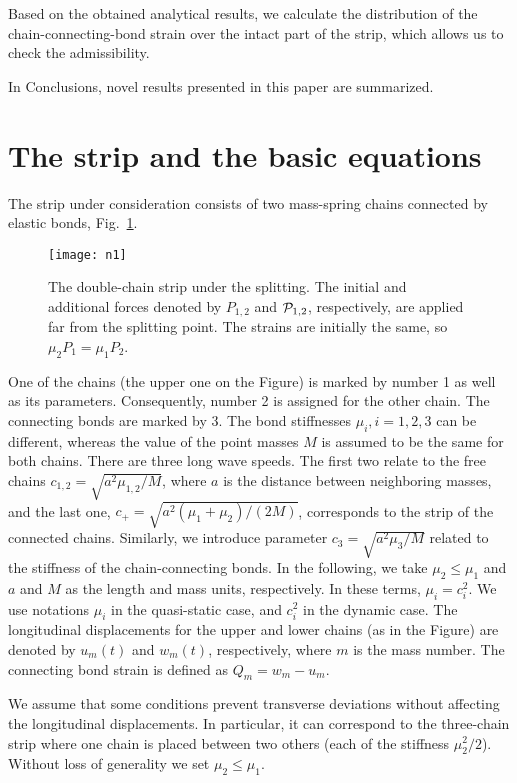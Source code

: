 \documentclass[12pt]{article}
\newcommand\fig[1]{Fig.~\ref{#1}}
\newcommand{\res}{respectively}
\newcommand{\CP}{{\cal P}}
\newcommand{\Gm}{\mu}
\begin{document}
Based on the obtained analytical results, we calculate the distribution of the chain-connecting-bond strain over the intact part of the strip, which allows us to check the admissibility.

In Conclusions, novel results presented in this paper are summarized.



\section{The strip and the basic equations}
The strip under consideration consists of two mass-spring chains connected by elastic bonds, \fig{f1}.
\begin{figure}[h]
\centering
\texttt{[image: n1]}

\vspace{-3mm}
\caption{The double-chain strip under the splitting. The initial and additional forces denoted by $P_{1,2}$ and $\CP_{1,2}$, \res, are applied far from the splitting point. The strains are initially the same, so $\Gm_2P_1=\Gm_1P_2$.}
\label{f1}
\end{figure}
One of the chains (the upper one on the Figure) is marked by number 1 as well as its parameters. Consequently, number 2 is assigned for the other chain. The connecting bonds are marked by 3. The bond stiffnesses $\Gm_i, i=1,2,3$ can be different, whereas the value of the point masses $M$ is assumed to be the same for both chains. There are three long wave speeds. The first two relate to the free chains $c_{1,2} = \sqrt{a^2\Gm_{1,2}/M}$, where $a$ is the distance between neighboring masses, and the last one, $c_+= \sqrt{a^2(\Gm_1+\Gm_2)/(2M)}$, corresponds to the strip of the connected chains. Similarly, we introduce parameter $c_3 = \sqrt{a^2\Gm_3/M}$  related to the stiffness of the chain-connecting bonds. In the following, we take $\Gm_2\le \Gm_1$ and $a$ and $M$ as the length and mass units, \res. In these terms, $\Gm_i = c_i^2$. We use notations $\Gm_i$  in the quasi-static case, and $c_i^2$ in the dynamic case. The longitudinal displacements for the upper and lower chains (as in the Figure) are denoted by $u_m(t)$ and $w_m(t)$, \res, where $m$ is the mass number. The connecting bond strain is defined as $Q_m=w_m-u_m$.

We assume that some conditions prevent transverse deviations without affecting the longitudinal displacements. In particular, it can correspond to the three-chain strip where one chain is placed between two others (each of the stiffness $\Gm_2^2/2$). Without loss of generality we set $\Gm_2\le \Gm_1$.
\end{document}
